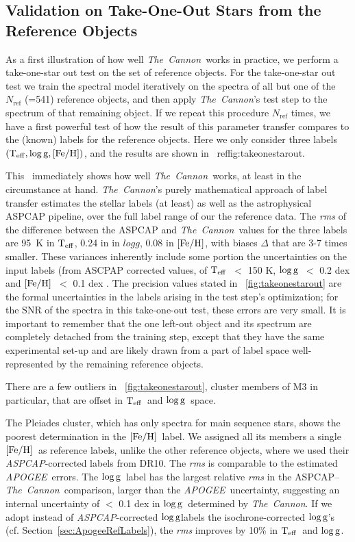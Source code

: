 \documentclass[12pt, preprint]{aastex}
\newcommand{\sectionname}{Section}
\newcommand{\tc}{\textsl{The~Cannon}}
\newcommand{\apogee}{\textsl{APOGEE}}
\newcommand{\aspcap}{\textsl{ASPCAP}}
\newcommand{\teff}{\mbox{$\rm T_{eff}$}}
\newcommand{\feh}{\mbox{$\rm [Fe/H]$}}
\newcommand{\logg}{\mbox{$\rm \log g$}}
\newcommand{\rfn}{\mathrm{ref}}
\begin{document}
\subsection{Validation on Take-One-Out Stars from the Reference Objects}
\label{sec:take-one-out}

As a first illustration of how well \tc\ works in practice, we perform a take-one-star out test on the set of reference objects.
For the take-one-star out test we train the spectral model iteratively on the spectra of all but one of the $N_\rfn$ (=541) 
reference objects, and then apply \tc 's test step to the spectrum of that remaining object. If we repeat this procedure $N_\rfn$ times, 
we have a first powerful test of how the result of this parameter transfer compares to the (known) labels for the reference objects.
 Here we only consider three labels $(\teff , \logg , \feh)$, and the results are shown in \figurename~ref{fig:takeonestarout}.

This \figurename\ immediately shows how well \tc\ works, at least in the circumstance at hand.
\tc 's purely mathematical approach of label transfer estimates the stellar labels (at least) as well as the astrophysical ASPCAP pipeline,
over the full label range of our the reference data. The \textit{rms} of the difference between the ASPCAP and \tc\ values for the three labels are
95~K in $\teff$, 0.24 in in $logg$, 0.08 in $\feh$, with biases $\Delta$ that are 3-7 times smaller.  
These variances inherently include some portion the uncertainties on the input labels (from ASCPAP corrected values, 
of \teff\ $<$ 150 K, \logg\ $<$ 0.2 dex and \feh\ $<$ 0.1 dex \citep{Meszaros2013}.
The precision values stated in \figurename~\ref{fig:takeonestarout} are the formal uncertainties in the labels arising 
in the test step's optimization; for the SNR of the spectra in this take-one-out test, these errors are very small.
It is important to remember that the one left-out object and its spectrum are completely detached from the training step, 
except that they have the same experimental set-up and are likely drawn from a part of label space well-represented by the remaining reference objects.

There are a few outliers in \figurename~\ref{fig:takeonestarout}, cluster members of M3 in particular, that are offset in \teff\ and \logg\ space. 

The Pleiades cluster, which has only spectra for main sequence stars, shows the poorest determination in the \feh\ label. We assigned all its members a single \feh ~as reference labels, unlike the other reference objects, where we used their \aspcap -corrected labels from DR10.
The \textit{rms} is comparable to the estimated \apogee\ errors. The \logg\ label has the largest relative \textit{rms} in the ASPCAP--\tc\ comparison, larger than the \apogee\ uncertainty, suggesting an internal uncertainty of $<$ 0.1 dex in \logg\ determined by \tc.
If we adopt instead of \aspcap -corrected \logg labels the isochrone-corrected \logg 's (cf. \sectionname~\ref{sec:ApogeeRefLabels}), the \textit{rms} improves by 10\% in \teff\ and \logg .
\end{document}
